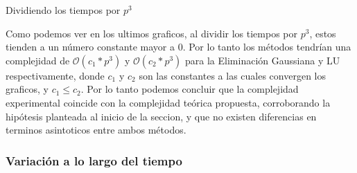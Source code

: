 \begin{center}

    \caption{Dividiendo los tiempos por $p^3$}
\end{center}

Como podemos ver en los ultimos graficos, al dividir los tiempos por $p^3$, estos tienden a un número constante mayor a 0. Por lo tanto los métodos tendrían una complejidad
de $\mathcal{O}(c_{1}*p^3)$ y $\mathcal{O}(c_{2}*p^3)$ para la Eliminación Gaussiana y LU respectivamente, donde $c_{1}$ y $c_{2}$ son las constantes a las cuales convergen los graficos, y $c_{1} \leq c_{2}$.
Por lo tanto podemos concluir que la complejidad experimental coincide con la complejidad teórica propuesta, corroborando la hipótesis planteada al inicio de la seccion, y que no existen diferencias en terminos asintoticos entre ambos métodos.


\subsubsection{Variación a lo largo del tiempo}

